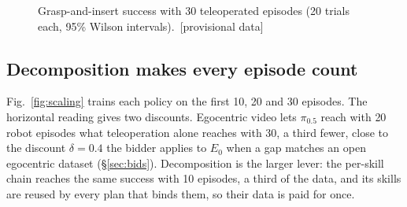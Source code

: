 \documentclass[10pt,twocolumn,letterpaper]{article}
\newif\ifprovisional \provisionaltrue
\newcommand{\prov}[1]{\ifprovisional\textcolor{prov}{#1}\else#1\fi}
\newcommand{\provtag}{\ifprovisional\ \textcolor{prov}{[provisional data]}\fi}
\begin{document}
\begin{figure}[t]
\centering
{}
\caption{Grasp-and-insert success with 30 teleoperated episodes (20 trials each, 95\% Wilson intervals).\provtag}
\label{fig:success}
\end{figure}

\subsection{Decomposition makes every episode count}\label{sec:res-scaling}
Fig.~\ref{fig:scaling} trains each policy on the first 10, 20 and 30 episodes. The horizontal reading gives two
discounts. Egocentric video lets $\pi_{0.5}$ reach with \prov{20} robot episodes what teleoperation alone reaches with
30, \prov{a third} fewer, close to the discount $\delta=0.4$ the bidder applies to $E_0$ when a gap matches an open
egocentric dataset (\S\ref{sec:bids}). Decomposition is the larger lever: the per-skill chain reaches the same success
with \prov{10} episodes, a third of the data, and its skills are reused by every plan that binds them, so their data is
paid for once.
\end{document}
